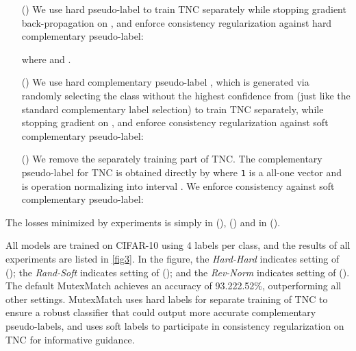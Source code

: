 \documentclass[lettersize,journal]{IEEEtran}
\theoremstyle{plain}
\theoremstyle{definition}
\theoremstyle{remark}
\begin{document}
\begin{enumerate}
  \item [(\romannumeral1)] 
  We use hard pseudo-label   to train TNC separately while stopping gradient back-propagation on , 
and enforce consistency regularization against hard complementary pseudo-label: 


where  and .    
  \item [(\romannumeral2)]
  We use hard complementary pseudo-label , which is generated via randomly selecting the class without the highest confidence from  (just like the standard complementary label selection) to train TNC separately, while stopping gradient on , 
and enforce consistency regularization against soft complementary pseudo-label: 


  \item [(\romannumeral3)]
  We remove the separately training part of TNC. The complementary pseudo-label for TNC is obtained directly by  where \texttt{1} is a all-one vector and   is operation normalizing  into interval . We enforce consistency against soft complementary pseudo-label: 

\end{enumerate}

The losses minimized by experiments is simply  in (), () and  in (). 

All models are trained on CIFAR-10 using 4 labels per class, and the results of all experiments are listed in \cref{fig3}.
In the figure, the \textit{Hard-Hard} indicates setting of (); the \textit{Rand-Soft} indicates setting of (); and the \textit{Rev-Norm} indicates setting of (). 
The default MutexMatch achieves an accuracy of 93.222.52\%, outperforming all other settings.
MutexMatch uses hard labels for separate training of TNC to ensure a robust classifier that could output more accurate complementary pseudo-labels, 
and uses soft labels to participate in consistency regularization on TNC for informative guidance.
\end{document}
